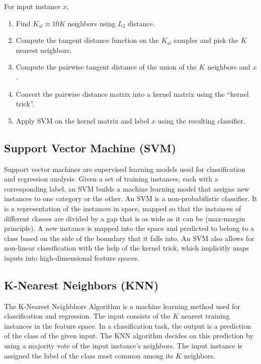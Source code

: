 \documentclass[11pt,letterpaper]{article}
\begin{document}
For input instance $x$,
\begin{enumerate}[(1)]
\item Find $K_{sl} \approx 10K$ neighbors using $L_2$ distance.
\item Compute the tangent distance function on the $K_{sl}$ samples and pick the $K$ nearest neighbors.
\item Compute the pairwise tangent distance of the union of the $K$ neighbors and $x$.
\item Convert the pairwise distance matrix into a kernel matrix using the ``kernel trick''.
\item Apply SVM on the kernel matrix and label $x$ using the resulting classifier.
\end{enumerate}

\subsection{Support Vector Machine (SVM)}

Support vector machines are supervised learning models used for classification and regression analysis. Given a set of training instances, each with a corresponding label, an SVM builds a machine learning model that assigns new instances to one category or the other. An SVM is a non-probabilistic classifier. It is a representation of the instances in space, mapped so that the instances of different classes are divided by a gap that is as wide as it can be (max-margin principle). A new instance is mapped into the space and predicted to belong to a class based on the side of the boundary that it falls into. An SVM also allows for non-linear classification with the help of the kernel trick, which implicitly maps inputs into high-dimensional feature spaces. 

\subsection{K-Nearest Neighbors (KNN)}

The K-Nearest Neighbhors Algorithm is a machine learning method used for classification and regression. The input consists of the $K$ nearest training instances in the feature space. In a classification task, the output is a prediction of the class of the given input. The KNN algorithm decides on this prediction by using a majority vote of the input instance's neighbors. The input instance is assigned the label of the class most common among its $K$ neighbors.
\end{document}
